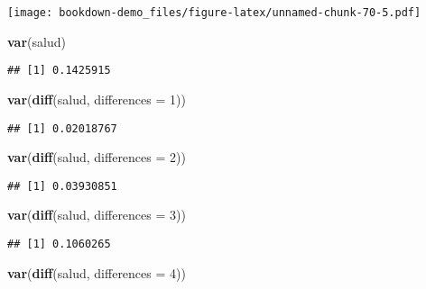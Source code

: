 \documentclass[]{book}
\newenvironment{Shaded}{\begin{snugshade}}{\end{snugshade}}
\newcommand{\KeywordTok}[1]{\textcolor[rgb]{0.13,0.29,0.53}{\textbf{#1}}}
\newcommand{\DataTypeTok}[1]{\textcolor[rgb]{0.13,0.29,0.53}{#1}}
\newcommand{\DecValTok}[1]{\textcolor[rgb]{0.00,0.00,0.81}{#1}}
\newcommand{\NormalTok}[1]{#1}
\theoremstyle{definition}
\theoremstyle{definition}
\theoremstyle{definition}
\theoremstyle{remark}
\begin{document}
\texttt{[image: bookdown-demo\_files/figure-latex/unnamed-chunk-70-5.pdf]}

\begin{Shaded}
\begin{Highlighting}[]
\KeywordTok{var}\NormalTok{(salud)}
\end{Highlighting}
\end{Shaded}

\begin{verbatim}
## [1] 0.1425915
\end{verbatim}

\begin{Shaded}
\begin{Highlighting}[]
\KeywordTok{var}\NormalTok{(}\KeywordTok{diff}\NormalTok{(salud, }\DataTypeTok{differences =} \DecValTok{1}\NormalTok{))}
\end{Highlighting}
\end{Shaded}

\begin{verbatim}
## [1] 0.02018767
\end{verbatim}

\begin{Shaded}
\begin{Highlighting}[]
\KeywordTok{var}\NormalTok{(}\KeywordTok{diff}\NormalTok{(salud, }\DataTypeTok{differences =} \DecValTok{2}\NormalTok{))}
\end{Highlighting}
\end{Shaded}

\begin{verbatim}
## [1] 0.03930851
\end{verbatim}

\begin{Shaded}
\begin{Highlighting}[]
\KeywordTok{var}\NormalTok{(}\KeywordTok{diff}\NormalTok{(salud, }\DataTypeTok{differences =} \DecValTok{3}\NormalTok{))}
\end{Highlighting}
\end{Shaded}

\begin{verbatim}
## [1] 0.1060265
\end{verbatim}

\begin{Shaded}
\begin{Highlighting}[]
\KeywordTok{var}\NormalTok{(}\KeywordTok{diff}\NormalTok{(salud, }\DataTypeTok{differences =} \DecValTok{4}\NormalTok{))}
\end{Highlighting}
\end{Shaded}
\end{document}
